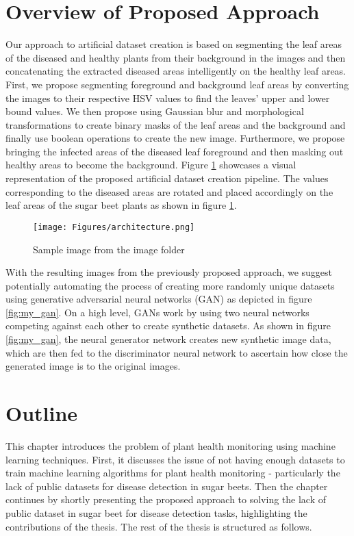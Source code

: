 \section{Overview of Proposed Approach}
Our approach to artificial dataset creation is based on segmenting the leaf areas of the diseased and healthy plants from their background in the images and then concatenating the extracted diseased areas intelligently on the healthy leaf areas. First, we propose segmenting foreground and background leaf areas by converting the images to their respective HSV values to find the leaves’ upper and lower bound values. We then propose using Gaussian blur and morphological transformations to create binary masks of the leaf areas and the background and finally use boolean operations to create the new image. Furthermore, we propose bringing the infected areas of the diseased leaf foreground and then masking out healthy areas to become the background. Figure \ref{fig:my_arch} showcases a visual representation of the proposed artificial dataset creation pipeline. The values corresponding to the diseased areas are rotated and placed accordingly on the leaf areas of the sugar beet plants as shown in figure \ref{fig:my_arch}.

\begin{figure}[!htb]
    \centering
    \texttt{[image: Figures/architecture.png]}
    \caption{Sample image from the image folder}
    \label{fig:my_arch}
\end{figure}

With the resulting images from the previously proposed approach, we suggest potentially automating the process of creating more randomly unique datasets using generative adversarial neural networks (GAN) as depicted in figure \ref{fig:my_gan}. On a high level, GANs work by using two neural networks competing against each other to create synthetic datasets. As shown in figure \ref{fig:my_gan}, the neural generator network creates new synthetic image data, which are then fed to the discriminator neural network to ascertain how close the generated image is to the original images.

\section{Outline}
This chapter introduces the problem of plant health monitoring using machine learning techniques. First, it discusses the issue of not having enough datasets to train machine learning algorithms for plant health monitoring - particularly the lack of public datasets for disease detection in sugar beets. Then the chapter continues by shortly presenting the proposed approach to solving the lack of public dataset in sugar beet for disease detection tasks, highlighting the contributions of the thesis. The rest of the thesis is structured as follows.

